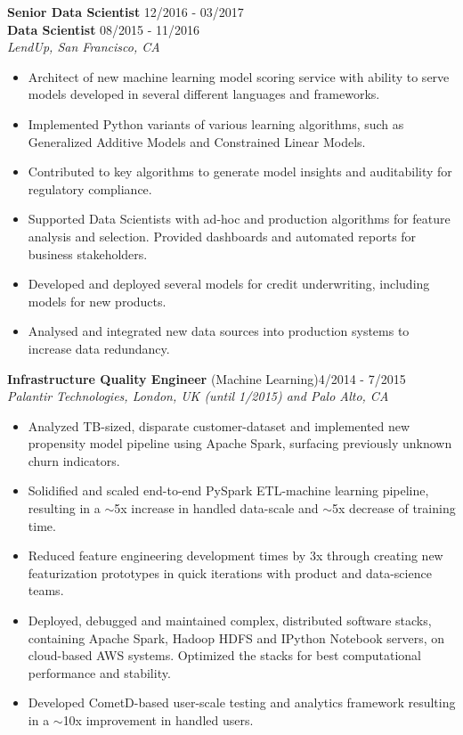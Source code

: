\documentclass[10pt,centered]{./res} %
\begin{document}
\begin{resume}
{\bf Senior Data Scientist} \hfill12/2016 - 03/2017 \\
{\bf Data Scientist} \hfill08/2015 - 11/2016 \\
{\it LendUp, San Francisco, CA}
\begin{itemize}
  \item Architect of new machine learning model scoring service with ability to serve models developed in several different languages and frameworks.
  \item Implemented Python variants of various learning algorithms, such as Generalized Additive Models and Constrained Linear Models.
  \item Contributed to key algorithms to generate model insights and auditability for regulatory compliance.
  \item Supported Data Scientists with ad-hoc and production algorithms for feature analysis and selection. Provided dashboards and automated reports for business stakeholders.
  \item Developed and deployed several models for credit underwriting, including models for new products.
  \item Analysed and integrated new data sources into production systems to increase data redundancy.
\end{itemize}

{\bf Infrastructure Quality Engineer} (Machine Learning)\hfill4/2014 - 7/2015 \\
{\it Palantir Technologies, London, UK (until 1/2015) and Palo Alto, CA}
\begin{itemize}
  \item Analyzed TB-sized, disparate customer-dataset and implemented new propensity model pipeline using Apache Spark, surfacing previously unknown churn indicators.
  \item Solidified and scaled end-to-end PySpark ETL-machine learning pipeline, resulting in a $\sim$5x increase in handled data-scale and $\sim$5x decrease of training time.
  \item Reduced feature engineering development times by 3x through creating new featurization prototypes in quick iterations with product and data-science teams.
  \item Deployed, debugged and maintained complex, distributed software stacks, containing Apache Spark, Hadoop HDFS and IPython Notebook servers, on cloud-based AWS systems. Optimized the stacks for best computational performance and stability.
  \item Developed CometD-based user-scale testing and analytics framework resulting in a $\sim$10x improvement in handled users.
\end{itemize}


\end{resume}
\end{document}
